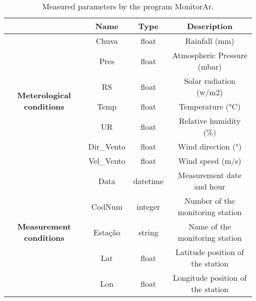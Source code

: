\begin{table*}[t]
    \centering
    \begin{tabular}{c|c|c|c|}
        \cline{2-4}
       & \textbf{Name} & \textbf{Type} & \textbf{Description}              \\ \hline
        \multicolumn{1}{|c|}{\multirow{7}{*}{\textbf{Meterological conditions}}} & Chuva         & float         & Rainfall (mm)                     \\ \cline{2-4} 
        \multicolumn{1}{|c|}{}                                                   & Pres          & float         & Atmospheric Pressure (mbar)       \\ \cline{2-4} 
        \multicolumn{1}{|c|}{}                                                   & RS            & float         & Solar radiation (w/m2)            \\ \cline{2-4} 
        \multicolumn{1}{|c|}{}                                                   & Temp          & float         & Temperature (°C)                  \\ \cline{2-4} 
        \multicolumn{1}{|c|}{}                                                   & UR            & float         & Relative humidity (\%)            \\ \cline{2-4} 
        \multicolumn{1}{|c|}{}                                                   & Dir\_Vento    & float         & Wind direction (°)                \\ \cline{2-4} 
        \multicolumn{1}{|c|}{}                                                   & Vel\_Vento    & float         & Wind speed (m/s)                  \\ \hline
        \multicolumn{1}{|c|}{\multirow{5}{*}{\textbf{Measurement conditions}}}   & Data          & datetime      & Measurement date and hour         \\ \cline{2-4} 
        \multicolumn{1}{|c|}{}                                                   & CodNum        & integer        & Number of the monitoring station  \\ \cline{2-4} 
        \multicolumn{1}{|c|}{}                                                   & Estação       & string        & Name of the monitoring station    \\ \cline{2-4} 
        \multicolumn{1}{|c|}{}                                                   & Lat           & float         & Latitude position of the station  \\ \cline{2-4} 
        \multicolumn{1}{|c|}{}                                                   & Lon           & float         & Longitude position of the station \\ \hline
        \end{tabular}
    \caption{Measured parameters by the program MonitorAr.}
    \label{tab:measured-data}
\end{table*}

